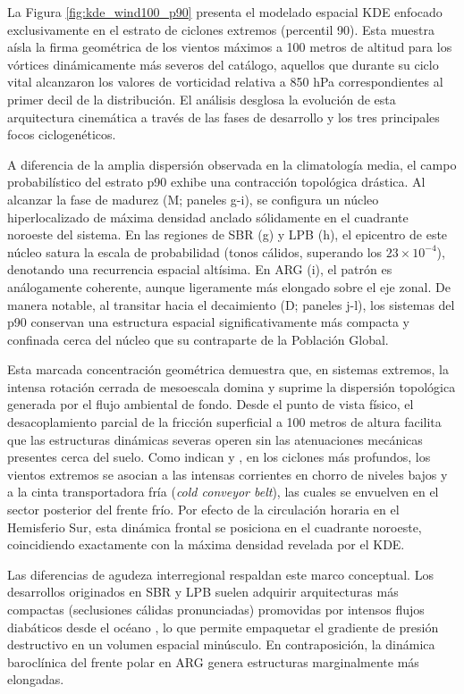 La Figura \ref{fig:kde_wind100_p90} presenta el modelado espacial KDE enfocado exclusivamente en el estrato de ciclones extremos (percentil 90). Esta muestra aísla la firma geométrica de los vientos máximos a 100 metros de altitud para los vórtices dinámicamente más severos del catálogo, aquellos que durante su ciclo vital alcanzaron los valores de vorticidad relativa a 850 hPa correspondientes al primer decil de la distribución. El análisis desglosa la evolución de esta arquitectura cinemática a través de las fases de desarrollo y los tres principales focos ciclogenéticos.

A diferencia de la amplia dispersión observada en la climatología media, el campo probabilístico del estrato p90 exhibe una contracción topológica drástica. Al alcanzar la fase de madurez (M; paneles g-i), se configura un núcleo hiperlocalizado de máxima densidad anclado sólidamente en el cuadrante noroeste del sistema. En las regiones de SBR (g) y LPB (h), el epicentro de este núcleo satura la escala de probabilidad (tonos cálidos, superando los $23 \times 10^{-4}$), denotando una recurrencia espacial altísima. En ARG (i), el patrón es análogamente coherente, aunque ligeramente más elongado sobre el eje zonal. De manera notable, al transitar hacia el decaimiento (D; paneles j-l), los sistemas del p90 conservan una estructura espacial significativamente más compacta y confinada cerca del núcleo que su contraparte de la Población Global.

Esta marcada concentración geométrica demuestra que, en sistemas extremos, la intensa rotación cerrada de mesoescala domina y suprime la dispersión topológica generada por el flujo ambiental de fondo. Desde el punto de vista físico, el desacoplamiento parcial de la fricción superficial a 100 metros de altura facilita que las estructuras dinámicas severas operen sin las atenuaciones mecánicas presentes cerca del suelo. Como indican \citet{clark2005sting} y \citet{han2025system}, en los ciclones más profundos, los vientos extremos se asocian a las intensas corrientes en chorro de niveles bajos y a la cinta transportadora fría (\textit{cold conveyor belt}), las cuales se envuelven en el sector posterior del frente frío. Por efecto de la circulación horaria en el Hemisferio Sur, esta dinámica frontal se posiciona en el cuadrante noroeste, coincidiendo exactamente con la máxima densidad revelada por el KDE. 

Las diferencias de agudeza interregional respaldan este marco conceptual. Los desarrollos originados en SBR y LPB suelen adquirir arquitecturas más compactas (seclusiones cálidas pronunciadas) promovidas por intensos flujos diabáticos desde el océano \citep{reboita2018extratropical, gramcianinov2023impact}, lo que permite empaquetar el gradiente de presión destructivo en un volumen espacial minúsculo. En contraposición, la dinámica baroclínica del frente polar en ARG genera estructuras marginalmente más elongadas.

